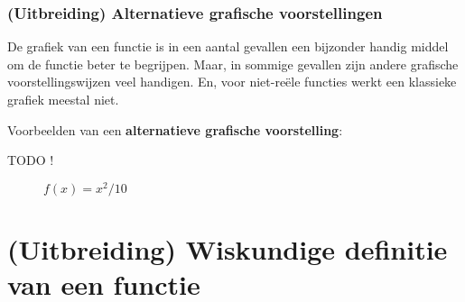 \documentclass{ximera}
\begin{document}
\subsubsection{(Uitbreiding) Alternatieve grafische voorstellingen}

De grafiek van een functie is in een aantal gevallen een bijzonder handig middel om de functie beter te begrijpen. Maar, in sommige gevallen zijn andere grafische voorstellingswijzen veel handigen. En, voor niet-reële functies werkt een klassieke grafiek meestal niet.

Voorbeelden van een \textbf{alternatieve grafische voorstelling}:


TODO !
\begin{figure}%
	\centering
	\begin{minipage}{0.45\textwidth}
		\centering
		
		
		
		\caption{$f(x) = x + 5$}
	\end{minipage}\hfill
	\begin{minipage}{0.45\textwidth}
		\centering
		
		
		\caption{$f(x) = x^2/10$}
	\end{minipage}
\end{figure}



\pagebreak
\section{(Uitbreiding) Wiskundige definitie van een functie}
\end{document}
